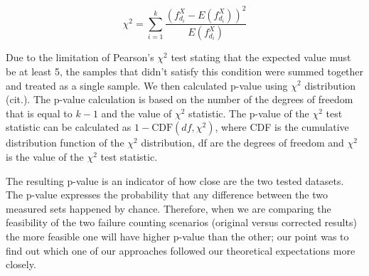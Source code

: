 \documentclass[
  digital,  	%
  color,		%
  oneside,   	%
  12pt,
  nocover,
  notable,
  nolof,
  nolot,
]{fithesis3}
\theoremstyle{definition}
\theoremstyle{remark}
\begin{document}
\begin{equation}
\label{eq:chi_square_stat}
\chi^2 = \sum\limits_{i=1}^{k} \frac{  \left(f_{d_i}^{X} - E \left(f_{d_i}^{X}\right) \right)^2 }{E \left(f_{d_i}^{X}\right)}
\end{equation}

Due to the limitation of Pearson's $\chi^2$ test stating that the expected value must be at least 5, the samples that didn't satisfy this condition were summed together and treated as a single sample. We then calculated p-value using $\chi^2$ distribution (cit.). The p-value calculation is based on the number of the degrees of freedom that is equal to $k-1$ and the value of $\chi^2$ statistic. The p-value of the $\chi^2$ test statistic can be calculated as $1 - \text{CDF}(df, \chi^2)$, where CDF is the cumulative distribution function of the $\chi^2$ distribution, df are the degrees of freedom and $\chi^2$ is the value of the $\chi^2$ test statistic.

The resulting p-value is an indicator of how close are the two tested datasets. The p-value expresses the probability that any difference between the two measured sets happened by chance. Therefore, when we are comparing the feasibility of the two failure counting scenarios (original versus corrected results) the more feasible one will have higher p-value than the other; our point was to find out which one of our approaches followed our theoretical expectations more closely.
\end{document}
